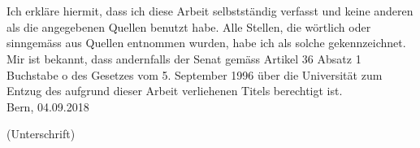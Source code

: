 
\FloatBarrier
\newpage


\thispagestyle{empty}

\ \vspace{1cm}

 \\[0.4cm]

\noindent Ich erkl\"are hiermit, dass ich diese Arbeit selbstst\"andig verfasst und keine
anderen als die angegebenen Quellen benutzt habe. Alle Stellen, die w\"ortlich oder sinngem\"ass aus Quellen entnommen wurden, habe ich als solche gekennzeichnet. Mir ist bekannt, dass andernfalls der Senat gem\"ass Artikel 36 Absatz 1 Buchstabe o des Gesetzes vom 5. September 1996 \"uber die Universit\"at zum Entzug des aufgrund dieser Arbeit verliehenen Titels
berechtigt ist.\\[0.5cm]

\noindent Bern, 04.09.2018 \hspace{5cm} \hrulefill \hspace{1cm} \\[0cm]
\noindent \begin{minipage}[h]{15cm} \hspace{10cm}  {\small (Unterschrift)}
\end{minipage}


